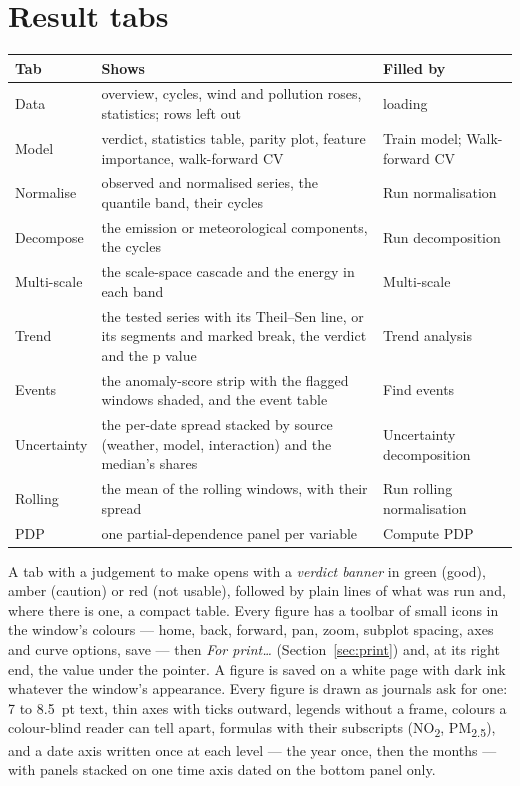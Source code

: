 \documentclass[11pt]{report}
\newcommand{\NOtwo}{NO\textsubscript{2}}
\newcommand{\PMtwo}{PM\textsubscript{2.5}}
\begin{document}
\section{Result tabs}
\begin{center}\small
\begin{tabular}{@{}p{2.2cm}p{7.2cm}p{5.2cm}@{}}
\toprule
Tab & Shows & Filled by \\
\midrule
Data        & overview, cycles, wind and pollution roses, statistics; rows left out & loading \\
Model       & verdict, statistics table, parity plot, feature importance, walk-forward CV & Train model; Walk-forward CV \\
Normalise   & observed and normalised series, the quantile band, their cycles & Run normalisation \\
Decompose   & the emission or meteorological components, the cycles & Run decomposition \\
Multi-scale & the scale-space cascade and the energy in each band & Multi-scale \\
Trend       & the tested series with its Theil--Sen line, or its segments and marked break, the verdict and the p value & Trend analysis \\
Events      & the anomaly-score strip with the flagged windows shaded, and the event table & Find events \\
Uncertainty & the per-date spread stacked by source (weather, model, interaction) and the median's shares & Uncertainty decomposition \\
Rolling     & the mean of the rolling windows, with their spread & Run rolling normalisation \\
PDP         & one partial-dependence panel per variable & Compute PDP \\
\bottomrule
\end{tabular}
\end{center}
A tab with a judgement to make opens with a \emph{verdict banner} in green (good), amber
(caution) or red (not usable), followed by plain lines of what was run and, where there
is one, a compact table. Every figure has a toolbar of small icons in the window's
colours --- home, back, forward, pan, zoom, subplot spacing, axes and curve options,
save --- then \emph{For print\ldots} (Section~\ref{sec:print}) and, at its right end, the
value under the pointer. A figure is saved on a white page with dark ink whatever the
window's appearance. Every figure is drawn as journals ask for one: 7 to 8.5~pt text, thin
axes with ticks outward, legends without a frame, colours a colour-blind reader can tell
apart, formulas with their subscripts (\NOtwo{}, \PMtwo{}), and a date axis written once
at each level --- the year once, then the months --- with panels stacked on one time axis
dated on the bottom panel only.
\end{document}
